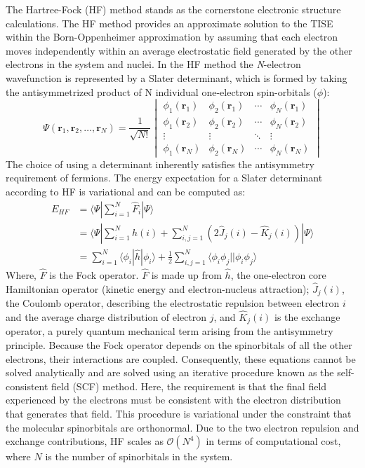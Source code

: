 The Hartree-Fock (HF) method stands as the cornerstone electronic structure calculations\cite{szabo1996modern}. The HF method provides an approximate solution to the TISE within the Born-Oppenheimer approximation by assuming that each electron moves independently within an average electrostatic field generated by the other electrons in the system and nuclei. In the HF method the \textit{N}-electron wavefunction is represented by a Slater determinant, which is formed by taking the antisymmetrized product of N individual one-electron spin-orbitals ($\phi$):
\begin{equation}\label{eq:SlaterDet}
    \Psi(\mathbf{r}_1, \mathbf{r}_2, \dots, \mathbf{r}_N) = \frac{1}{\sqrt{N!}}
    \begin{vmatrix}
      \phi_1(\mathbf{r}_1) & \phi_2(\mathbf{r}_1) & \cdots & \phi_N(\mathbf{r}_1) \\
      \phi_1(\mathbf{r}_2) & \phi_2(\mathbf{r}_2) & \cdots & \phi_N(\mathbf{r}_2) \\
      \vdots & \vdots & \ddots & \vdots \\
      \phi_1(\mathbf{r}_N) & \phi_2(\mathbf{r}_N) & \cdots & \phi_N(\mathbf{r}_N)
    \end{vmatrix}
  \end{equation}
The choice of using a determinant inherently satisfies the antisymmetry requirement of fermions. The energy expectation for a Slater determinant according to HF is variational and can be computed as:
\begin{equation}\label{EHF}
    \begin{aligned}
        E_{HF} &= \langle \Psi | \sum_{i=1}^{N} \hat{F}_i  | \Psi \rangle \\
            &= \langle \Psi | \sum_{i=1}^{N} \hat{h}(i) + \sum_{i,j=1}^{N} (2\hat{J}_j(i) - \hat{K}_j(i)) | \Psi \rangle\\ 
            &= \sum_{i=1}^{N} \langle \phi_i | \hat{h} | \phi_i \rangle + \frac{1}{2} \sum_{i,j=1}^{N} \langle \phi_i \phi_j || \phi_i \phi_j \rangle
    \end{aligned}
\end{equation}
Where, $\hat{F}$ is the Fock operator. $\hat{F}$ is made up from $\hat{h}$, the one-electron core Hamiltonian operator (kinetic energy and electron-nucleus attraction); $\hat{J}_j(i)$, the Coulomb operator, describing the electrostatic repulsion between electron $i$ and the average charge distribution of electron $j$, and $\hat{K}_j(i)$ is the exchange operator, a purely quantum mechanical term arising from the antisymmetry principle. Because the Fock operator depends on the spinorbitals of all the other electrons, their interactions are coupled. Consequently, these equations cannot be solved analytically and are solved using an iterative procedure known as the self-consistent field (SCF) method. Here, the requirement is that the final field experienced by the electrons must be consistent with the electron distribution that generates that field. This procedure is variational under the constraint that the molecular spinorbitals are orthonormal. Due to the two electron repulsion and exchange contributions, HF scales as $\mathcal{O}(N^4)$ in terms of computational cost, where $N$ is the number of spinorbitals in the system. \\ 

